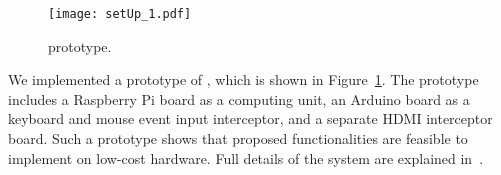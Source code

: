 \begin{figure}[t]
    \centering
    \texttt{[image: setUp\_1.pdf]}
    \caption{\protection prototype.}
\label{fig:prototype}   
\end{figure}

We implemented a prototype of \protection, which is shown in Figure~\ref{fig:prototype}. The prototype includes a Raspberry Pi board as a computing unit, an Arduino board as a keyboard and mouse event input interceptor, and a separate HDMI interceptor board. Such a prototype shows that proposed functionalities are feasible to implement on low-cost hardware. Full details of the \protection system are explained in~\cite{protection}.

